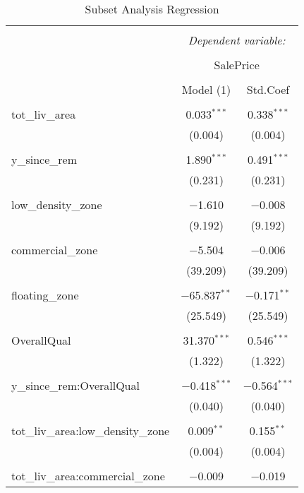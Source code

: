 \documentclass[a4paper]{article}
\begin{document}
\begin{table}[!htbp] \centering 
  \caption{Subset Analysis Regression} 
  \label{} 
\begin{tabular}{@{\extracolsep{0pt}}lcc} 
\\[-5.5ex]\hline 
\hline \\[-1.8ex] 
 & \multicolumn{2}{c}{\textit{Dependent variable:}} \\ 
\cline{2-3} 
\\[-1.8ex] & \multicolumn{2}{c}{SalePrice} \\ 
\\[-1.8ex] & Model (1) & Std.Coef\\ 
\hline \\[-1.8ex] 
 tot\_liv\_area & 0.033$^{***}$ & 0.338$^{***}$ \\ 
  & (0.004) & (0.004) \\ 
  & & \\ 
 y\_since\_rem & 1.890$^{***}$ & 0.491$^{***}$ \\ 
  & (0.231) & (0.231) \\ 
  & & \\ 
 low\_density\_zone & $-$1.610 & $-$0.008 \\ 
  & (9.192) & (9.192) \\ 
  & & \\ 
 commercial\_zone & $-$5.504 & $-$0.006 \\ 
  & (39.209) & (39.209) \\ 
  & & \\ 
 floating\_zone & $-$65.837$^{**}$ & $-$0.171$^{**}$ \\ 
  & (25.549) & (25.549) \\ 
  & & \\ 
 OverallQual & 31.370$^{***}$ & 0.546$^{***}$ \\ 
  & (1.322) & (1.322) \\ 
  & & \\ 
 y\_since\_rem:OverallQual & $-$0.418$^{***}$ & $-$0.564$^{***}$ \\ 
  & (0.040) & (0.040) \\ 
  & & \\ 
 tot\_liv\_area:low\_density\_zone & 0.009$^{**}$ & 0.155$^{**}$ \\ 
  & (0.004) & (0.004) \\ 
  & & \\ 
 tot\_liv\_area:commercial\_zone & $-$0.009 & $-$0.019 \\ 

\end{tabular}
\end{table}
\end{document}
